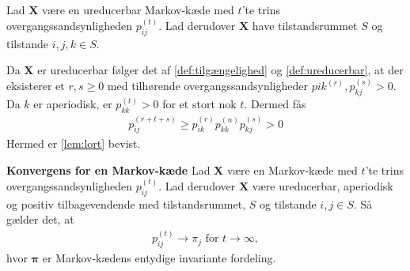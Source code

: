\begin{bev} \textbf{} %
\newline
Lad $\bm X$ være en ureducerbar Markov-kæde med $t$'te trins overgangssandsynligheden $p_{ij}^{(t)}$. Lad derudover $\bm X$ have tilstandsrummet $S$ og tilstande $i, j, k \in S$.

Da $\bm X$ er ureducerbar følger det af \autoref{def:tilgængelighed} og \autoref{def:ureducerbar}, at der eksisterer et $r, s\geq 0$ med tilhørende overgangssandsynligheder $p{ik}^{(r)}, p_{kj}^{(s)}>0$. Da $k$ er aperiodisk, er $p_{kk}^{(t)} > 0$ for et stort nok $t$. Dermed fås
\begin{align*}
    p_{ij}^{(r+t+s)}\geq p_{ik}^{(r)}p_{kk}^{(n)}p_{kj}^{(s)}>0
\end{align*}
Hermed er \autoref{lem:lort} bevist. 
\end{bev}

\begin{minipage}\textwidth
\begin{thmx} \textbf{Konvergens for en Markov-kæde}\label{sæt:konvergens_for_markov} %
\newline
Lad $\bm X$ være en Markov-kæde med $t$'te trins overgangssandsynligheden $p_{ij}^{(t)}$. Lad derudover $\bm X$ være ureducerbar, aperiodisk og positiv tilbagevendende med tilstandsrummet, $S$ og tilstande $i, j\in S$. Så gælder det, at 
\begin{align*}
    p_{ij}^{(t)} \to \pi_j \text{ for } t \to \infty,
\end{align*}
hvor $\bm \pi$ er Markov-kædens entydige invariante fordeling. 
\end{thmx}
\end{minipage}

